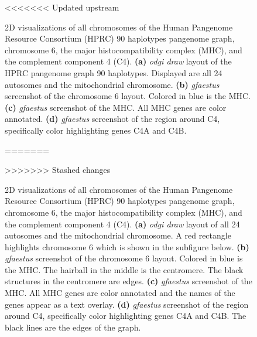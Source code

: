 \begin{figure}[!htb]
\begin{subfigure}{1.0\textwidth}
	\label{fig:sfig4}
\end{subfigure}	
<<<<<<< Updated upstream
	\caption{2D visualizations of all chromosomes of the Human Pangenome Resource Consortium (HPRC) 90 haplotypes pangenome graph, chromosome 6, the major histocompatibility complex (MHC), and the complement component 4 (C4). \textbf{(a)} \textit{odgi draw} layout of the HPRC pangenome graph 90 haplotypes. Displayed are all 24 autosomes and the mitochondrial chromosome. \textbf{(b)} \textit{gfaestus} screenshot of the chromosome 6 layout. Colored in blue is the MHC. \textbf{(c)} \textit{gfaestus} screenshot of the MHC. All MHC genes are color annotated. \textbf{(d)} \textit{gfaestus} screenshot of the region around C4, specifically color highlighting genes C4A and C4B.}
=======
	\caption{2D visualizations of all chromosomes of the Human Pangenome Resource Consortium (HPRC) 90 haplotypes pangenome graph, chromosome 6, the major histocompatibility complex (MHC), and the complement component 4 (C4). 
	\textbf{(a)} \textit{odgi draw} layout of all 24 autosomes and the mitochondrial chromosome. 
	A red rectangle highlights chromosome 6 which is shown in the subfigure below. \textbf{(b)} \textit{gfaestus} screenshot of the chromosome 6 layout. Colored in blue is the MHC. 
	The hairball in the middle is the centromere. 
	The black structures in the centromere are edges. 
	\textbf{(c)} \textit{gfaestus} screenshot of the MHC. 
	All MHC genes are color annotated and the names of the genes appear as a text overlay. \textbf{(d)} \textit{gfaestus} screenshot of the region around C4, specifically color highlighting genes C4A and C4B. 
	The black lines are the edges of the graph.}
>>>>>>> Stashed changes
	\label{fig:2d_layouts}
\end{figure}